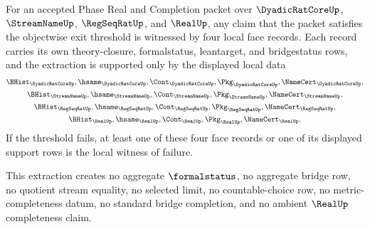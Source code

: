 \begin{theorem}
\label{thm:real-l10-local-face-record-witness-extraction}
For an accepted Phase Real and Completion packet over
$\DyadicRatCoreUp$, $\StreamNameUp$, $\RegSeqRatUp$, and $\RealUp$, any
claim that the packet satisfies the objectwise exit threshold is witnessed by
four local face records. Each record carries its own theory-closure,
formalstatus, leantarget, and bridgestatus rows, and the extraction is supported
only by the displayed local data
$$
\begin{gathered}
\BHist_{\DyadicRatCoreUp},\hsame_{\DyadicRatCoreUp},\Cont_{\DyadicRatCoreUp},
\Pkg_{\DyadicRatCoreUp},\NameCert_{\DyadicRatCoreUp},\\
\BHist_{\StreamNameUp},\hsame_{\StreamNameUp},\Cont_{\StreamNameUp},
\Pkg_{\StreamNameUp},\NameCert_{\StreamNameUp},\\
\BHist_{\RegSeqRatUp},\hsame_{\RegSeqRatUp},\Cont_{\RegSeqRatUp},
\Pkg_{\RegSeqRatUp},\NameCert_{\RegSeqRatUp},\\
\BHist_{\RealUp},\hsame_{\RealUp},\Cont_{\RealUp},
\Pkg_{\RealUp},\NameCert_{\RealUp}.
\end{gathered}
$$
If the threshold fails, at least one of these four face records or one of its
displayed support rows is the local witness of failure.

This extraction creates no aggregate $\formalstatus$, no aggregate bridge row,
no quotient stream equality, no selected limit, no countable-choice row, no
metric-completeness datum, no standard bridge completion, and no ambient
$\RealUp$ completeness claim.
\end{theorem}
